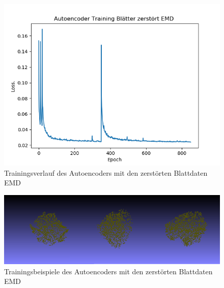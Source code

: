 \documentclass{llncs}
\begin{document}
\begin{figure}[htbp] 
	\centering
	\includegraphics[width=1.2\textwidth]{autoencoder_training_bleatter_zer_result_emd.png}
	\caption{Trainingsverlauf des Autoencoders mit den zerstörten Blattdaten EMD}
	\label{fig:Bild44}
\end{figure}
\begin{figure}[htbp] 
	\centering
	\includegraphics[width=1.2\textwidth]{autoencoder_destroyed_example.png}
	\caption{Trainingsbeispiele des Autoencoders mit den zerstörten Blattdaten EMD}
	\label{fig:Bild44}
\end{figure}
\end{document}
